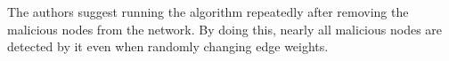 The authors suggest running the algorithm repeatedly after removing the malicious nodes from the network.
By doing this, nearly all malicious nodes are detected by it even when randomly changing edge weights.

%
%
%

\begin{figure}
\centering


\end{figure}

